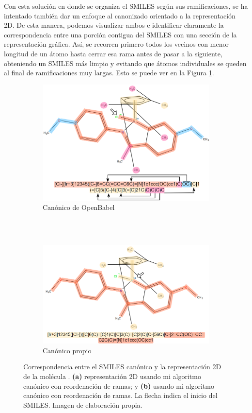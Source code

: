 \pagebreak

Con esta solución en donde se organiza el SMILES según sus ramificaciones, se ha intentado también dar un enfoque al canonizado orientado a la representación 2D. De esta manera, podemos visualizar ambos e identificar claramente la correspondencia entre una porción contigua del SMILES con una sección de la representación gráfica. Así, se recorren primero todos los vecinos con menor longitud de un átomo hasta cerrar esa rama antes de pasar a la siguiente, obteniendo un SMILES más limpio y evitando que átomos individuales se queden al final de ramificaciones muy largas. Esto se puede ver en la Figura \ref{fig:smiles_vs_dibujo}.

\begin{figure}[h!]
\begin{subfigure}{.9\textwidth}
  \centering
  \includegraphics[width=.8\linewidth]{imagenes/resultados/moleculas/mol31_subrayao_malCanon.png}
  \caption{Canónico de OpenBabel}
\end{subfigure}%
\\
\\
\begin{subfigure}{.9\textwidth}
  \centering
  \includegraphics[width=.8\linewidth]{imagenes/resultados/moleculas/mol31_subrayao.png}
  \caption{Canónico propio}
\end{subfigure}
\caption{Correspondencia entre el SMILES canónico y la representación 2D de la molécula . \textbf{(a)} representación 2D usando mi algoritmo canónico con reordenación de ramas; y \textbf{(b)} usando mi algoritmo canónico con reordenación de ramas. La flecha indica el inicio del SMILES. Imagen de elaboración propia.}
\label{fig:smiles_vs_dibujo}
\end{figure}

